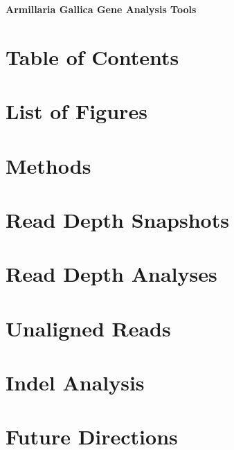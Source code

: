 \documentclass[12pt]{article}
\begin{document}
	
	\begin{center}
	{\bf \Large Armillaria Gallica Gene Analysis Tools}
	\end{center}

	\section{Table of Contents}
	\tableofcontents
	\newpage 

	\section{List of Figures}
	\listoffigures
	\newpage

	\listoftables
	\newpage

	\section{Methods}
	
	\newpage

	\section{Read Depth Snapshots}
	
	\newpage

	\section{Read Depth Analyses}
	
	\newpage

%	

	\section{Unaligned Reads}	
	
	\newpage

	\section{Indel Analysis}
	
	\newpage

	\section{Future Directions}
	
	\newpage

	
	
	
\end{document}
